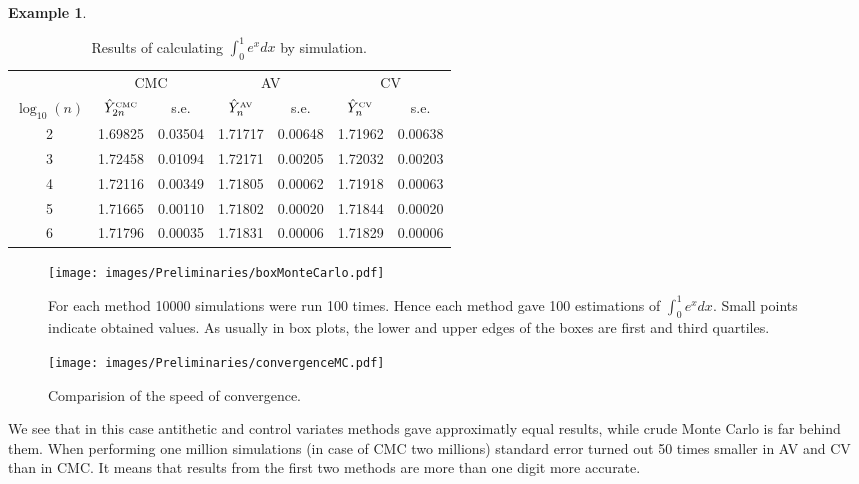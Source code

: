 \documentclass[a4paper,11pt, twoside]{book}
\theoremstyle{definition}
\newtheorem{example}{Example}[chapter]
\theoremstyle{remark}
\def\CMC[#1]{\hat{Y}^{\hbox{\tiny CMC}}_{#1}}
\def\AV[#1]{\hat{Y}^{\hbox{\tiny AV}}_{#1}}
\def\CV[#1]{\hat{Y}^{\hbox{\tiny CV}}_{#1}}
\begin{document}
\begin{example}
\begin{table}[h]
\centering
 \caption{Results of calculating $\int_0^1 e^x dx$ by simulation.}
 \label{tab:MCcompare}
\begin{tabular} {||c | c | c | c | c |c | c ||}  
 \hline 
  & \multicolumn{2}{|c|}{ CMC } & \multicolumn{2}{|c|}{ AV } & \multicolumn{2}{|c|}{ CV } \\
  $\log_{10}(n)$ & \multicolumn{1}{c}{ $\CMC[2n]$ } & \multicolumn{1}{c|}{ s.e. } & \multicolumn{1}{c}{ $\AV[n]$ } & \multicolumn{1}{c|}{ s.e. } & \multicolumn{1}{c}{ $\CV[n]$ } & \multicolumn{1}{c|}{ s.e. } \\ \hline \hline 
  2 & 1.69825 & 0.03504 & 1.71717 & 0.00648 & 1.71962 & 0.00638 \\ \hline 
  3 & 1.72458 & 0.01094 & 1.72171 & 0.00205 & 1.72032 & 0.00203 \\ \hline 
  4 & 1.72116 & 0.00349 & 1.71805 & 0.00062 & 1.71918 & 0.00063 \\ \hline 
  5 & 1.71665 & 0.00110 & 1.71802 & 0.00020 & 1.71844 & 0.00020 \\ \hline 
  6 & 1.71796 & 0.00035 & 1.71831 & 0.00006 & 1.71829 & 0.00006 \\ \hline 
\end{tabular}  
\end{table}

\begin{figure}
\centering
 \texttt{[image: images/Preliminaries/boxMonteCarlo.pdf]}
\caption{For each method 10000 simulations were run 100 times. Hence each method gave 100 estimations of $\int_0^1 e^x dx$. Small points indicate obtained values. As usually in box plots, the lower and upper edges of the boxes are first and third quartiles.  }
\label{fig:boxMC}
\end{figure}

\begin{figure}
\centering
 \texttt{[image: images/Preliminaries/convergenceMC.pdf]}
\caption{Comparision of the speed of convergence. }
\label{fig:convergenceMC}
\end{figure}

We see that in this case antithetic and control variates methods gave approximatly equal results, while crude Monte Carlo is far behind them. When performing one million simulations (in case of CMC two millions) standard error turned out 50 times smaller in AV and CV than in CMC. It means that results from the first two methods are more than one digit more accurate.


\end{example}
\end{document}
